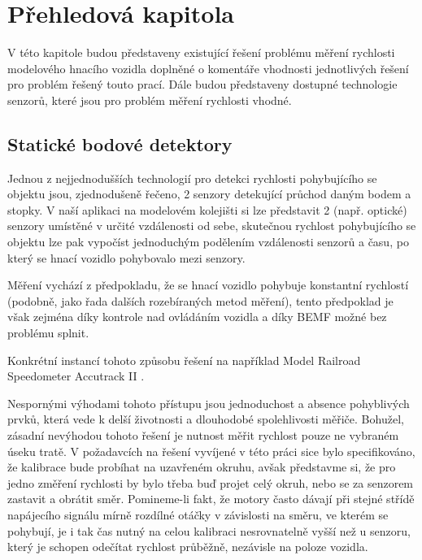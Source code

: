 \documentclass[12pt,a4paper]{article}
\begin{document}
\pagestyle{empty}
\noindent



\section{Přehledová kapitola}

V této kapitole budou představeny existující řešení problému měření rychlosti
modelového hnacího vozidla doplněné o komentáře vhodnosti jednotlivých řešení
pro problém řešený touto prací. Dále budou představeny dostupné technologie
senzorů, které jsou pro problém měření rychlosti vhodné.

\subsection{Statické bodové detektory}

Jednou z nejjednodušších technologií pro detekci rychlosti pohybujícího se
objektu jsou, zjednodušeně řečeno, 2 senzory detekující průchod daným bodem
a stopky. V naší aplikaci na modelovém kolejišti si lze představit 2
(např. optické) senzory umístěné v určité vzdálenosti od sebe, skutečnou
rychlost pohybujícího se objektu lze pak vypočíst jednoduchým podělením
vzdálenosti senzorů a času, po který se hnací vozidlo pohybovalo mezi senzory.

Měření vychází z předpokladu, že se hnací vozidlo pohybuje konstantní
rychlostí (podobně, jako řada dalších rozebíraných metod měření), tento
předpoklad je však zejména díky kontrole nad ovládáním vozidla a díky BEMF
možné bez problému splnit.

Konkrétní instancí tohoto způsobu řešení na například Model Railroad Speedometer
Accutrack II \cite{accutrackII}.

Nespornými výhodami tohoto přístupu jsou jednoduchost a absence pohyblivých
prvků, která vede k delší životnosti a dlouhodobé spolehlivosti měřiče. Bohužel,
zásadní nevýhodou tohoto řešení je nutnost měřit rychlost pouze ne vybraném
úseku tratě. V požadavcích na řešení vyvíjené v této práci sice bylo specifikováno,
že kalibrace bude probíhat na uzavřeném okruhu, avšak představme si, že pro
jedno změření rychlosti by bylo třeba buď projet celý okruh, nebo se za senzorem
zastavit a obrátit směr. Pomineme-li fakt, že motory často dávají při stejné
střídě napájecího signálu mírně rozdílné otáčky v závislosti na směru, ve
kterém se pohybují, je i tak čas nutný na celou kalibraci nesrovnatelně vyšší
než u senzoru, který je schopen odečítat rychlost průběžně, nezávisle na
poloze vozidla.
\end{document}
